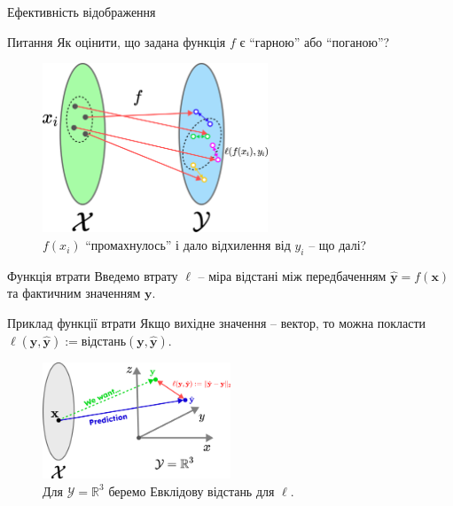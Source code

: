 \documentclass[xcolor={usenames,dvipsnames}]{beamer}
\newcommand{\cmark}{\ding{51}}%
\begin{document}
    \begin{frame}{Ефективність відображення}	
        \begin{exampleblock}{Питання}
            Як оцінити, що задана функція $f$ є ``гарною'' або ``поганою''?
        \end{exampleblock}
        
        \begin{figure}
            \centering
            \includegraphics[width=0.6\textwidth]{images/loss.png}
            \caption{$f(x_i)$ ``промахнулось'' і дало відхилення від $y_i$ -- що далі?}
        \end{figure}
	\end{frame}

    \begin{frame}{Функція втрати}
        \textcolor{ForestGreen}{\cmark} Введемо втрату $\ell$ -- міра відстані між передбаченням $\hat{\mathbf{y}}=f(\mathbf{x})$ та фактичним значенням $\mathbf{y}$.
    
        \begin{exampleblock}{Приклад функції втрати}
            Якщо вихідне значення -- вектор, то можна покласти $\ell(\mathbf{y},\hat{\mathbf{y}}) := \text{відстань}(\mathbf{y},\hat{\mathbf{y}})$.
        \end{exampleblock}
    
        \begin{figure}
            \centering
            \includegraphics[width=0.5\textwidth]{images/loss_R3.png}
            \caption{Для $\mathcal{Y}=\mathbb{R}^3$ беремо Евклідову відстань для $\ell$.}
        \end{figure}
	\end{frame}
 
\end{document}
